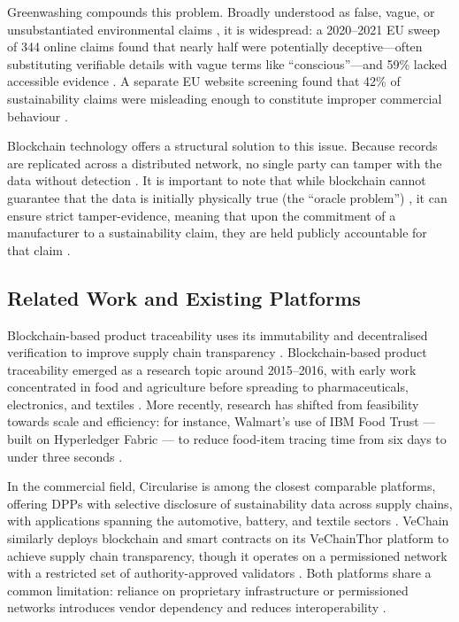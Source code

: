 \documentclass[runningheads]{llncs}
\begin{document}
	Greenwashing compounds this problem. Broadly understood as false, 
	vague, or unsubstantiated environmental claims 
	\cite{Kundi2024The}, it is widespread: a 2020--2021 EU sweep of 
	344 online claims found that nearly half were potentially 
	deceptive---often substituting verifiable details with vague terms 
	like ``conscious''---and 59\% lacked accessible evidence 
	\cite{Silva2021The}. A separate EU website screening found that 
	42\% of sustainability claims were misleading enough to constitute 
	improper commercial behaviour \cite{Silva2021The}.

	
	Blockchain technology offers a structural solution to this issue. Because 
	records are replicated across a distributed network, no single party can 
	tamper with the data without detection \cite{Casino2019Systematic,Nakamoto2008Bitcoin}. 
	It is important to note that while blockchain cannot guarantee that the data 
	is initially physically true (the ``oracle problem'') \cite{Egberts2017}, it 
	can ensure strict tamper-evidence, meaning that upon the commitment of a 
	manufacturer to a sustainability claim, they are held publicly accountable 
	for that claim \cite{Wood2014Ethereum}.
	
	
	\subsection{Related Work and Existing Platforms}
	Blockchain-based product traceability uses its immutability and decentralised verification to improve supply chain transparency \cite{Casino2019Systematic}. 
	Blockchain-based product traceability emerged as a research topic around 2015--2016, with early work concentrated in food and agriculture before spreading to pharmaceuticals, electronics, and textiles \cite{Ellahi2023Blockchain-Based,Tian2016Agri}. 
	More recently, research has shifted from feasibility towards scale and efficiency: for instance, Walmart's use of IBM Food Trust — built on Hyperledger Fabric — to reduce food-item tracing time from six days to under three seconds \cite{Ellahi2023Blockchain-Based} .
	
	In the commercial field, Circularise is among the closest comparable 
	platforms, offering DPPs with selective disclosure of sustainability data 
	across supply chains, with applications spanning the automotive, battery, and textile sectors \cite{Circularise2026Platform}.
	VeChain similarly deploys blockchain and smart contracts on its 
	VeChainThor platform to achieve supply chain transparency, though 
	it operates on a permissioned network with a restricted set of 
	authority-approved validators \cite{VeChain2026}.
	Both platforms share a common limitation: reliance on proprietary 
	infrastructure or permissioned networks introduces vendor 
	dependency and reduces interoperability 
	\cite{Belchior2020A,Wang2023Exploring}.
	
\end{document}
